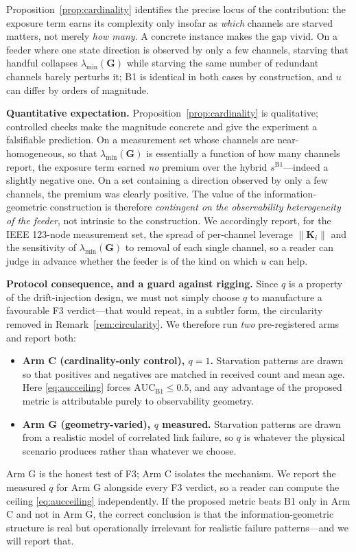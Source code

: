 \documentclass[journal]{IEEEtran}
\theoremstyle{plain}
\theoremstyle{definition}
\theoremstyle{remark}
\newcommand{\bG}{\mathbf{G}}
\newcommand{\lmin}{\lambda_{\min}}
\begin{document}
Proposition~\ref{prop:cardinality} identifies the precise locus of the
contribution: the exposure term earns its complexity only insofar as
\emph{which} channels are starved matters, not merely \emph{how many}. A
concrete instance makes the gap vivid. On a feeder where one state
direction is observed by only a few channels, starving that handful
collapses $\lmin(\bG)$ while starving the same number of redundant
channels barely perturbs it; B1 is identical in both cases by
construction, and $u$ can differ by orders of magnitude.

\textbf{Quantitative expectation.} Proposition~\ref{prop:cardinality} is
qualitative; controlled checks make the magnitude concrete and give the
experiment a falsifiable prediction. On a measurement set whose channels
are near-homogeneous, so that $\lmin(\bG)$ is essentially a function of
how many channels report, the exposure term earned \emph{no} premium over
the hybrid $s^{\mathrm{B1}}$---indeed a slightly negative one. On a set
containing a direction observed by only a few channels, the premium was
clearly positive. The value of the information-geometric construction is
therefore \emph{contingent on the observability heterogeneity of the
feeder}, not intrinsic to the construction. We accordingly report, for the
IEEE 123-node measurement set, the spread of per-channel leverage
$\|\mathbf{K}_i\|$ and the sensitivity of $\lmin(\bG)$ to removal of each
single channel, so a reader can judge in advance whether the feeder is of
the kind on which $u$ can help.

\textbf{Protocol consequence, and a guard against rigging.} Since $q$ is a
property of the drift-injection design, we must not simply choose $q$ to
manufacture a favourable F3 verdict---that would repeat, in a subtler
form, the circularity removed in Remark~\ref{rem:circularity}. We
therefore run \emph{two} pre-registered arms and report both:
\begin{itemize}
\item \textbf{Arm C (cardinality-only control), $q=1$.} Starvation
patterns are drawn so that positives and negatives are matched in received
count and mean age. Here \eqref{eq:aucceiling} forces
$\mathrm{AUC}_{\mathrm{B1}}\le0.5$, and any advantage of the proposed
metric is attributable purely to observability geometry.
\item \textbf{Arm G (geometry-varied), $q$ measured.} Starvation patterns
are drawn from a realistic model of correlated link failure, so $q$ is
whatever the physical scenario produces rather than whatever we choose.
\end{itemize}
Arm G is the honest test of F3; Arm C isolates the mechanism. We report
the measured $q$ for Arm G alongside every F3 verdict, so a reader can
compute the ceiling \eqref{eq:aucceiling} independently. If the proposed
metric beats B1 only in Arm C and not in Arm G, the correct conclusion is
that the information-geometric structure is real but operationally
irrelevant for realistic failure patterns---and we will report that.
\end{document}
